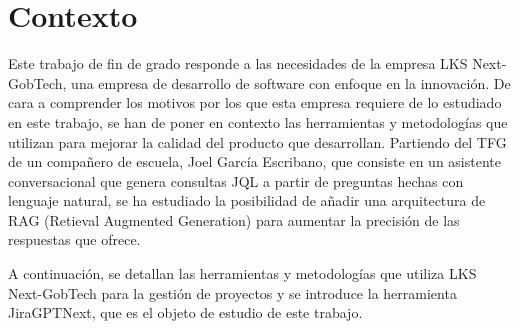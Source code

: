 \section{Contexto}

Este trabajo de fin de grado responde a las necesidades de la empresa LKS Next-GobTech, una empresa de desarrollo de software con enfoque en la innovación. De cara a comprender los motivos por los que esta empresa requiere de lo estudiado en este trabajo, se han de poner en contexto las herramientas y metodologías que utilizan para mejorar la calidad del producto que desarrollan. Partiendo del TFG de un compañero de escuela, Joel García Escribano, que consiste en un asistente conversacional que genera consultas JQL a partir de preguntas hechas con lenguaje natural, se ha estudiado la posibilidad de añadir una arquitectura de RAG (Retieval Augmented Generation) para aumentar la precisión de las respuestas que ofrece.

A continuación, se detallan las herramientas y metodologías que utiliza LKS Next-GobTech para la gestión de proyectos y se introduce la herramienta JiraGPTNext, que es el objeto de estudio de este trabajo.




